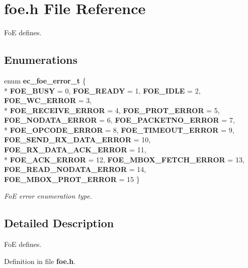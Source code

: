 \section{foe.\-h File Reference}
\label{foe_8h}


Fo\-E defines.  


\subsection*{Enumerations}
\begin{DoxyCompactItemize}
\item 
enum {\bf ec\-\_\-foe\-\_\-error\-\_\-t} \{ \\*
{\bf F\-O\-E\-\_\-\-B\-U\-S\-Y} =  0, 
{\bf F\-O\-E\-\_\-\-R\-E\-A\-D\-Y} =  1, 
{\bf F\-O\-E\-\_\-\-I\-D\-L\-E} =  2, 
{\bf F\-O\-E\-\_\-\-W\-C\-\_\-\-E\-R\-R\-O\-R} =  3, 
\\*
{\bf F\-O\-E\-\_\-\-R\-E\-C\-E\-I\-V\-E\-\_\-\-E\-R\-R\-O\-R} =  4, 
{\bf F\-O\-E\-\_\-\-P\-R\-O\-T\-\_\-\-E\-R\-R\-O\-R} =  5, 
{\bf F\-O\-E\-\_\-\-N\-O\-D\-A\-T\-A\-\_\-\-E\-R\-R\-O\-R} =  6, 
{\bf F\-O\-E\-\_\-\-P\-A\-C\-K\-E\-T\-N\-O\-\_\-\-E\-R\-R\-O\-R} =  7, 
\\*
{\bf F\-O\-E\-\_\-\-O\-P\-C\-O\-D\-E\-\_\-\-E\-R\-R\-O\-R} =  8, 
{\bf F\-O\-E\-\_\-\-T\-I\-M\-E\-O\-U\-T\-\_\-\-E\-R\-R\-O\-R} =  9, 
{\bf F\-O\-E\-\_\-\-S\-E\-N\-D\-\_\-\-R\-X\-\_\-\-D\-A\-T\-A\-\_\-\-E\-R\-R\-O\-R} =  10, 
{\bf F\-O\-E\-\_\-\-R\-X\-\_\-\-D\-A\-T\-A\-\_\-\-A\-C\-K\-\_\-\-E\-R\-R\-O\-R} =  11, 
\\*
{\bf F\-O\-E\-\_\-\-A\-C\-K\-\_\-\-E\-R\-R\-O\-R} =  12, 
{\bf F\-O\-E\-\_\-\-M\-B\-O\-X\-\_\-\-F\-E\-T\-C\-H\-\_\-\-E\-R\-R\-O\-R} =  13, 
{\bf F\-O\-E\-\_\-\-R\-E\-A\-D\-\_\-\-N\-O\-D\-A\-T\-A\-\_\-\-E\-R\-R\-O\-R} =  14, 
{\bf F\-O\-E\-\_\-\-M\-B\-O\-X\-\_\-\-P\-R\-O\-T\-\_\-\-E\-R\-R\-O\-R} =  15
 \}
\begin{DoxyCompactList}\small\item\em Fo\-E error enumeration type. \end{DoxyCompactList}\end{DoxyCompactItemize}


\subsection{Detailed Description}
Fo\-E defines. 

Definition in file {\bf foe.\-h}.



